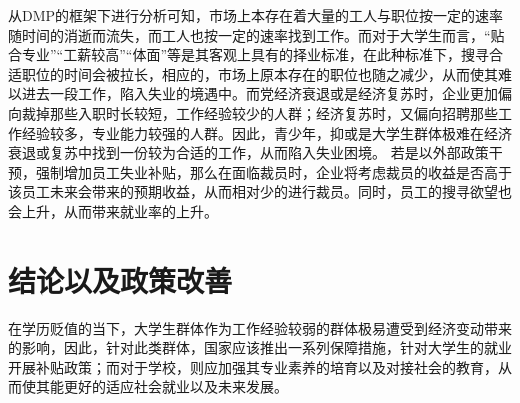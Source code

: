 从DMP的框架下进行分析可知，市场上本存在着大量的工人与职位按一定的速率随时间的消逝而流失，而工人也按一定的速率找到工作。而对于大学生而言，“贴合专业”“工薪较高”“体面”等是其客观上具有的择业标准，在此种标准下，搜寻合适职位的时间会被拉长，相应的，市场上原本存在的职位也随之减少，从而使其难以进去一段工作，陷入失业的境遇中。而党经济衰退或是经济复苏时，企业更加偏向裁掉那些入职时长较短，工作经验较少的人群；经济复苏时，又偏向招聘那些工作经验较多，专业能力较强的人群。因此，青少年，抑或是大学生群体极难在经济衰退或复苏中找到一份较为合适的工作，从而陷入失业困境。
若是以外部政策干预，强制增加员工失业补贴，那么在面临裁员时，企业将考虑裁员的收益是否高于该员工未来会带来的预期收益，从而相对少的进行裁员。同时，员工的搜寻欲望也会上升，从而带来就业率的上升。

\section{结论以及政策改善}

在学历贬值的当下，大学生群体作为工作经验较弱的群体极易遭受到经济变动带来的影响，因此，针对此类群体，国家应该推出一系列保障措施，针对大学生的就业开展补贴政策；而对于学校，则应加强其专业素养的培育以及对接社会的教育，从而使其能更好的适应社会就业以及未来发展。





